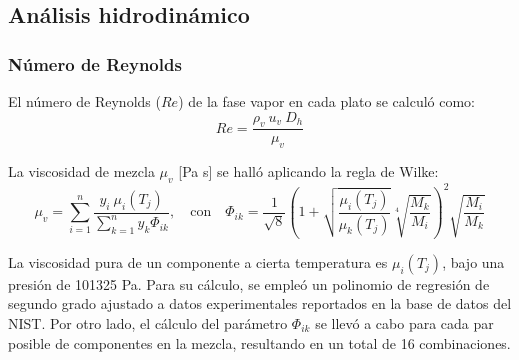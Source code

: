 \subsection{Análisis hidrodinámico}

\subsubsection{Número de Reynolds}
El número de Reynolds ($Re$) de la fase vapor en cada plato se calculó como:
$$
    Re = \frac{\rho_v\ u_v\ D_h}{\mu_{v}}
$$

La viscosidad de mezcla $\mu_{v}$ [Pa s] se halló aplicando la regla de Wilke:
$$
    \mu_v = \sum_{i = 1}^n \frac{y_i\ \mu_i(T_j)}{\displaystyle\sum_{k = 1}^n y_k \Phi_{ik}},
    \quad\text{con}\quad
    \Phi_{ik} = \frac{1}{\sqrt{8}}
    \left(1 + \sqrt{\frac{\mu_i(T_j)}{\mu_k(T_j)}} \sqrt[4]{\frac{M_k}{M_i}}\right)^2
    \sqrt{\frac{M_i}{M_k}}
$$

La viscosidad pura de un componente a cierta temperatura es $\mu_i(T_j)$, bajo una presión de 101325 Pa. Para su cálculo, se empleó un polinomio de regresión de segundo grado ajustado a datos experimentales reportados en la base de datos del NIST. Por otro lado, el cálculo del parámetro $\Phi_{ik}$ se llevó a cabo para cada par posible de componentes en la mezcla, resultando en un total de 16 combinaciones.

